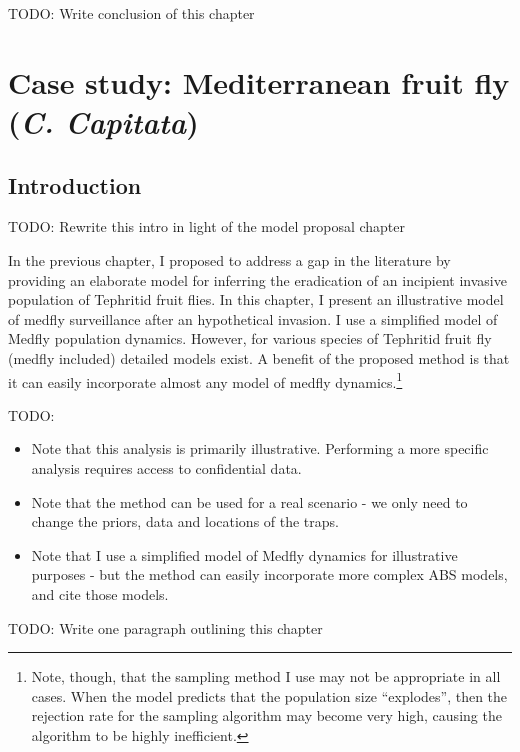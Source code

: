 \documentclass[
  oneside]{book}
\providecommand{\tightlist}{%
  \setlength{\itemsep}{0pt}\setlength{\parskip}{0pt}}
\begin{document}
TODO: Write conclusion of this chapter

\hypertarget{case-study-mediterranean-fruit-fly-c.-capitata}{%
\chapter{\texorpdfstring{Case study: Mediterranean fruit fly (\emph{C. Capitata})}{Case study: Mediterranean fruit fly (C. Capitata)}}\label{case-study-mediterranean-fruit-fly-c.-capitata}}

\hypertarget{introduction-3}{%
\section{Introduction}\label{introduction-3}}

TODO: Rewrite this intro in light of the model proposal chapter

In the previous chapter, I proposed to address a gap in the literature by providing an elaborate model for inferring the eradication of an incipient invasive population of Tephritid fruit flies. In this chapter, I present an illustrative model of medfly surveillance after an hypothetical invasion. I use a simplified model of Medfly population dynamics. However, for various species of Tephritid fruit fly (medfly included) detailed models exist. A benefit of the proposed method is that it can easily incorporate almost any model of medfly dynamics.\footnote{Note, though, that the sampling method I use may not be appropriate in all cases. When the model predicts that the population size ``explodes'', then the rejection rate for the sampling algorithm may become very high, causing the algorithm to be highly inefficient.}

TODO:

\begin{itemize}
\tightlist
\item
  Note that this analysis is primarily illustrative. Performing a more specific analysis requires access to confidential data.
\item
  Note that the method can be used for a real scenario - we only need to change the priors, data and locations of the traps.
\item
  Note that I use a simplified model of Medfly dynamics for illustrative purposes - but the method can easily incorporate more complex ABS models, and cite those models.
\end{itemize}

TODO: Write one paragraph outlining this chapter
\end{document}
